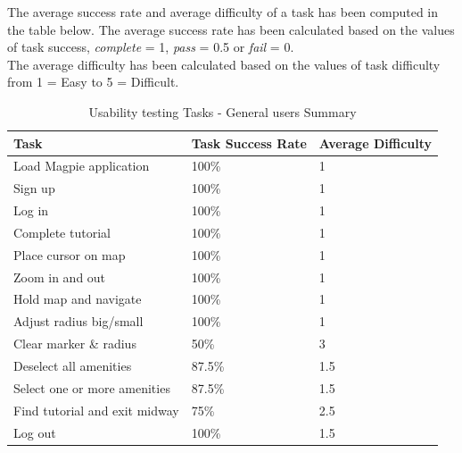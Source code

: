 The average success rate and average difficulty of a task has been computed in
the table below. The average success rate has been calculated based on the
values of task success, \emph{complete} = 1, \emph{pass} = 0.5 or \emph{fail} =
0.\\
The average difficulty has been calculated based on the values of task
difficulty from 1 = Easy to 5 = Difficult.
\begin{table}[h!]
    \centering
    \caption{Usability testing Tasks - General users Summary}
    \begin{tabular}{|p{}|p{}|p{}|}
        \hline
        \textbf{Task}                 & \textbf{Task Success Rate} & \textbf{Average Difficulty} \\
        \hline
        Load Magpie application       & 100\%                      & 1                           \\
        \hline
        Sign up                       & 100\%                      & 1                           \\
        \hline
        Log in                        & 100\%                      & 1                           \\
        \hline
        Complete tutorial             & 100\%                      & 1                           \\
        \hline
        Place cursor on map           & 100\%                      & 1                           \\
        \hline
        Zoom in and out               & 100\%                      & 1                           \\
        \hline
        Hold map and navigate         & 100\%                      & 1                           \\
        \hline
        Adjust radius big/small       & 100\%                      & 1                           \\
        \hline
        Clear marker \& radius        & 50\%                       & 3                           \\
        \hline
        Deselect all amenities        & 87.5\%                     & 1.5                         \\
        \hline
        Select one or more amenities  & 87.5\%                     & 1.5                         \\
        \hline
        Find tutorial and exit midway & 75\%                       & 2.5                         \\
        \hline
        Log out                       & 100\%                      & 1.5                         \\
        \hline
    \end{tabular}
\end{table}\\
